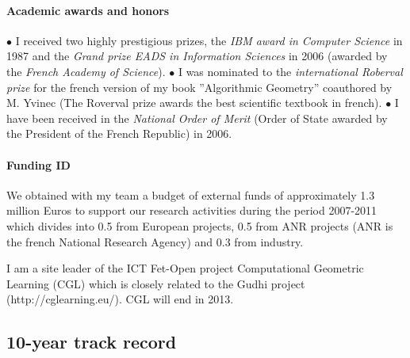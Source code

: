 \paragraph{Academic awards and honors}\mbox{}

$\bullet$ I received two highly prestigious prizes, the {\em IBM award in Computer Science}  in 1987
and the {\em Grand prize EADS in Information Sciences} in 2006 (awarded by the {\em French Academy of Science}).  $\bullet$  I was nominated to the {\em international Roberval prize} for the french version of my book ”Algorithmic Geometry” coauthored by M. Yvinec (The Roverval prize awards the best scientific textbook in french). $\bullet$  I have been received in the {\em National Order of Merit} (Order of State awarded by the President of the French Republic)  in 2006.

\paragraph{Funding ID} \mbox{}



We obtained with my team a budget of external funds of approximately 1.3 million Euros to support our research activities during the period 2007-2011 which divides into 0.5 from European projects,
0.5 from ANR projects (ANR is the french National Research Agency) and 0.3 from industry.

I am a site leader of the ICT Fet-Open project Computational Geometric Learning (CGL) which is closely related to the Gudhi project (http://cglearning.eu/). CGL will end in 2013. 

\newpage

\subsection{10-year track record}

